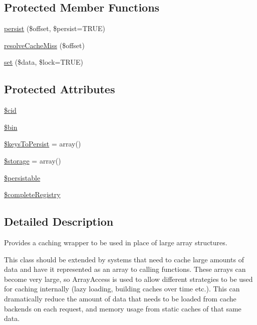 \subsection*{Protected Member Functions}
\begin{DoxyCompactItemize}
\item 
\hyperlink{group__schemaapi_ga27687007f42979bdb8999683f3270c4a}{persist} (\$offset, \$persist=TRUE)
\item 
\hyperlink{group__schemaapi_ga33d892a839b353177e2483f6946178e9}{resolveCacheMiss} (\$offset)
\item 
\hyperlink{group__schemaapi_ga9d99af903ba2660c09ca835e63c79118}{set} (\$data, \$lock=TRUE)
\end{DoxyCompactItemize}
\subsection*{Protected Attributes}
\begin{DoxyCompactItemize}
\item 
\hyperlink{classDrupalCacheArray_a616fba4b18bafdf4cc6e34c4b5696d58}{\$cid}
\item 
\hyperlink{group__schemaapi_ga29eeef3160c70f129c447e796e330cdb}{\$bin}
\item 
\hyperlink{group__schemaapi_ga0ba2e712f18ec2c8ee8bf97d115c85d1}{\$keysToPersist} = array()
\item 
\hyperlink{group__schemaapi_ga696fd96aa3639a9d7d968961db9d5819}{\$storage} = array()
\item 
\hyperlink{classDrupalCacheArray_a7e5f106aba0180abc924fee9b2137dd3}{\$persistable}
\item 
\hyperlink{classDrupalCacheArray_a31477bbed77e94f393202701a2179643}{\$completeRegistry}
\end{DoxyCompactItemize}


\subsection{Detailed Description}
Provides a caching wrapper to be used in place of large array structures.

This class should be extended by systems that need to cache large amounts of data and have it represented as an array to calling functions. These arrays can become very large, so ArrayAccess is used to allow different strategies to be used for caching internally (lazy loading, building caches over time etc.). This can dramatically reduce the amount of data that needs to be loaded from cache backends on each request, and memory usage from static caches of that same data.

